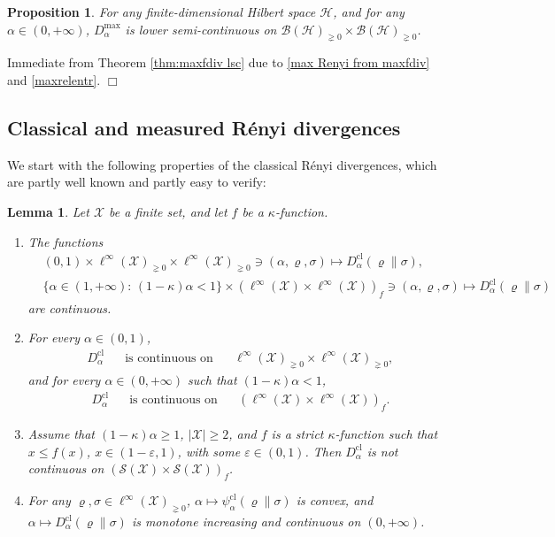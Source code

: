 \documentclass[unsortedaddress,superscriptaddress,pra,notitlepage]{revtex4}
\newtheorem{prop}[definition]{Proposition}
\newtheorem{lemma}[definition]{Lemma}
\newenvironment{proof}[1][Proof]{\begin{trivlist}
\item[\hskip \labelsep {\bfseries #1}]}{\hfill$\Box$\end{trivlist}}
\def\B{{\mathcal B}}
\def\S{{\mathcal S}}
\def\X{{\mathcal X}}
\def\ep{\varepsilon}
\def\rho{\varrho}
\def\hil{{\mathcal H}}
\def\bz{\left(}
\def\jz{\right)}
\def\pne{_{\gneq 0}}
\def\cl{\mathrm{cl}}
\def\cl{\mathrm{cl}}
\def\pwr{\kappa}
\newcommand{\ds}{\mbox{ }\mbox{ }}
\begin{document}
\begin{prop}
For any finite-dimensional Hilbert space $\hil$, and for any $\alpha\in(0,+\infty)$, 
$D_{\alpha}^{\max}$ is lower semi-continuous on $\B(\hil)\pne\times\B(\hil)\pne$.
\end{prop}
\begin{proof}
Immediate from 
Theorem \ref{thm:maxfdiv lsc} due to \eqref{max Renyi from maxfdiv}
and \eqref{maxrelentr}.
\end{proof}



\subsection{Classical and measured R\' enyi divergences}
\label{sec:classical cont}

We start with the following properties of the classical R\'enyi divergences, which are 
partly well known and partly easy to verify:
\begin{lemma}\label{lemma:classical cont}
Let $\X$ be a finite set, and let $f$ be a $\pwr$-function.
\begin{enumerate}
\item\label{cl cont1}
The functions 
\begin{align}
&(0,1)\times\ell^{\infty}(\X)\pne\times\ell^{\infty}(\X)\pne\ni(\alpha,\rho,\sigma)\mapsto
D_{\alpha}^{\cl}(\rho\|\sigma),\label{classical jointcont1}\\
&\{\alpha\in(1,+\infty):\,(1-\pwr)\alpha<1\}\times\bz\ell^{\infty}(\X)\times\ell^{\infty}(\X)\jz_{f}\ni(\alpha,\rho,\sigma)\mapsto
D_{\alpha}^{\cl}(\rho\|\sigma)\label{classical jointcont2}
\end{align}
are continuous.
\item\label{cl cont2}
For every $\alpha\in(0,1)$,
\begin{align}\label{classical cont1}
D_{\alpha}^{\cl} \ds\text{ is continuous on  }\ds\ell^{\infty}(\X)\pne\times\ell^{\infty}(\X)\pne,
\end{align}
and for every $\alpha\in(0,+\infty)$ such that $(1-\pwr)\alpha<1$,
\begin{align}\label{classical cont}
D_{\alpha}^{\cl} \ds\text{ is continuous on  }\ds
\bz\ell^{\infty}(\X)\times\ell^{\infty}(\X)\jz_{f}.
\end{align}
\item\label{cl cont0}
Assume that $(1-\pwr)\alpha\ge 1$, $|\X|\ge 2$, and 
$f$ is a strict $\pwr$-function such that $x\le f(x)$, $x\in(1-\ep,1)$, with some 
$\ep\in(0,1)$. Then 
$D_{\alpha}^{\cl}$ is not continuous on $\bz\S(\X)\times\S(\X)\jz_{f}$.
\item\label{cl cont3}
For any $\rho,\sigma\in \ell^{\infty}(\X)\pne$,
$\alpha\mapsto\psi_{\alpha}^{\cl}(\rho\|\sigma)$ is convex, and 
$\alpha\mapsto D_{\alpha}^{\cl}(\rho\|\sigma)$ is monotone increasing and continuous
 on $(0,+\infty)$.
\end{enumerate}
\end{lemma}
\end{document}
